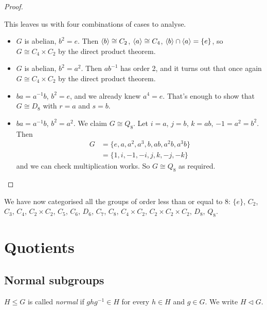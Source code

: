 \documentclass{../template/note}
\begin{document}
\begin{proof}
\begin{itemize}
            This leaves us with four combinations of cases to analyse.
            \begin{itemize}
                \item \(G\) is abelian, \(b^2 = e\). Then \(\left \langle b \right \rangle \cong C_2\), \(\left \langle a \right \rangle \cong C_4\), \(\left \langle b \right \rangle \cap \left \langle a \right \rangle = \{e\}\), so \(G \cong C_4 \times C_2\) by the direct product theorem.
                \item \(G\) is abelian, \(b^2 = a^2\). Then \(ab^{-1}\) has order 2, and it turns out that once again \(G \cong C_4 \times C_2\) by the direct product theorem.
                \item \(ba = a^{-1}b\), \(b^2 = e\), and we already knew \(a^4 = e\). That's enough to show that \(G \cong D_8\) with \(r = a\) and \(s = b\).
                \item \(ba = a^{-1}b\), \(b^2 = a^2\). We claim \(G \cong Q_8\). Let \(i = a\), \(j = b\), \(k = ab\), \(-1 = a^2 = b^2\). Then
                \begin{align*}
                    G &= \{e, a, a^2, a^3, b, ab, a^2b, a^3b\} \\
                    &= \{1, i, -1, -i, j, k, -j, -k\}
                \end{align*}
                and we can check multiplication works. So \(G \cong Q_8\) as required.
            \end{itemize}
        \end{itemize}
    \end{proof}
    
    We have now categorised all the groups of order less than or equal to 8: \(\{e\}\), \(C_2\), \(C_3\), \(C_4\), \(C_2 \times C_2\), \(C_5\), \(C_6\), \(D_6\), \(C_7\), \(C_8\), \(C_4 \times C_2\), \(C_2 \times C_2 \times C_2\), \(D_8\), \(Q_8\).

    \section{Quotients}
    
    \subsection{Normal subgroups}

    \begin{definition}
        \(H \leq G\) is called \emph{normal} if \(ghg^{-1} \in H\) for every \(h \in H\) and \(g \in G\). We write \(H \triangleleft G\).
    \end{definition}
    
\end{document}
